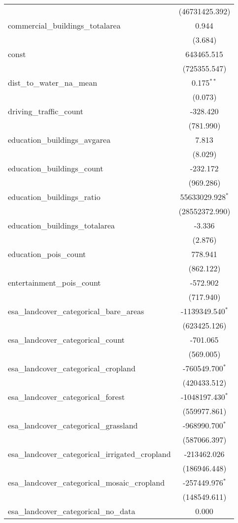 \begin{table}[!htbp]
\begin{tabular}{@{\extracolsep{5pt}}lc}
  & (46731425.392) \\
 commercial_buildings_totalarea & 0.944$^{}$ \\
  & (3.684) \\
 const & 643465.515$^{}$ \\
  & (725355.547) \\
 dist_to_water_na_mean & 0.175$^{**}$ \\
  & (0.073) \\
 driving_traffic_count & -328.420$^{}$ \\
  & (781.990) \\
 education_buildings_avgarea & 7.813$^{}$ \\
  & (8.029) \\
 education_buildings_count & -232.172$^{}$ \\
  & (969.286) \\
 education_buildings_ratio & 55633029.928$^{*}$ \\
  & (28552372.990) \\
 education_buildings_totalarea & -3.336$^{}$ \\
  & (2.876) \\
 education_pois_count & 778.941$^{}$ \\
  & (862.122) \\
 entertainment_pois_count & -572.902$^{}$ \\
  & (717.940) \\
 esa_landcover_categorical_bare_areas & -1139349.540$^{*}$ \\
  & (623425.126) \\
 esa_landcover_categorical_count & -701.065$^{}$ \\
  & (569.005) \\
 esa_landcover_categorical_cropland & -760549.700$^{*}$ \\
  & (420433.512) \\
 esa_landcover_categorical_forest & -1048197.430$^{*}$ \\
  & (559977.861) \\
 esa_landcover_categorical_grassland & -968990.700$^{*}$ \\
  & (587066.397) \\
 esa_landcover_categorical_irrigated_cropland & -213462.026$^{}$ \\
  & (186946.448) \\
 esa_landcover_categorical_mosaic_cropland & -257449.976$^{*}$ \\
  & (148549.611) \\
 esa_landcover_categorical_no_data & 0.000$^{}$ \\

\end{tabular}
\end{table}
